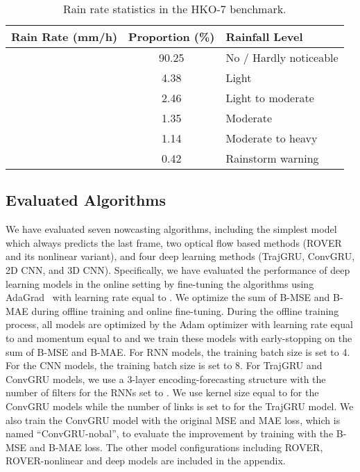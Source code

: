 \documentclass{article}
\begin{document}
\begin{table}[tb!]
\small
  \centering
  \caption{Rain rate statistics in the HKO-7 benchmark.}
  \begin{tabular}{rclcl}
    \toprule
    \multicolumn{3}{c}{Rain Rate (mm/h)}  & Proportion (\%) & Rainfall Level   \\
    \midrule
     &  &   & 90.25           & No / Hardly noticeable \\
     &  &   &  4.38           & Light                  \\
     &  &     &  2.46           & Light to moderate      \\
     &  &    &  1.35           & Moderate               \\
     &  &   &  1.14           & Moderate to heavy      \\
     &  &         & 0.42            & Rainstorm warning      \\
    \bottomrule
  \end{tabular}
  \vspace{-1.5em}
  \label{tbl:rain-rate-statistics}
\end{table}


\subsection{Evaluated Algorithms}
We have evaluated seven nowcasting algorithms, including the simplest model which always predicts the last frame, two optical flow based methods (ROVER and its nonlinear variant), and four deep learning methods (TrajGRU, ConvGRU, 2D CNN, and 3D CNN). Specifically, we have evaluated the performance of deep learning models in the online setting by fine-tuning the algorithms using AdaGrad~\cite{duchi2011adaptive} with learning rate equal to . We optimize the sum of B-MSE and B-MAE during offline training and online fine-tuning. During the offline training process, all models are optimized by the Adam optimizer with learning rate equal to  and momentum equal to  and we train these models with early-stopping on the sum of B-MSE and B-MAE. For RNN models, the training batch size is set to 4. For the CNN models, the training batch size is set to 8. For TrajGRU and ConvGRU models, we use a 3-layer encoding-forecasting structure with the number of filters for the RNNs set to . We use kernel size equal to  for the ConvGRU models while the number of links is set to  for the TrajGRU model. We also train the ConvGRU model with the original MSE and MAE loss, which is named ``ConvGRU-nobal'', to evaluate the improvement by training with the B-MSE and B-MAE loss. The other model configurations including ROVER, ROVER-nonlinear and deep models are included in the appendix.
\end{document}
